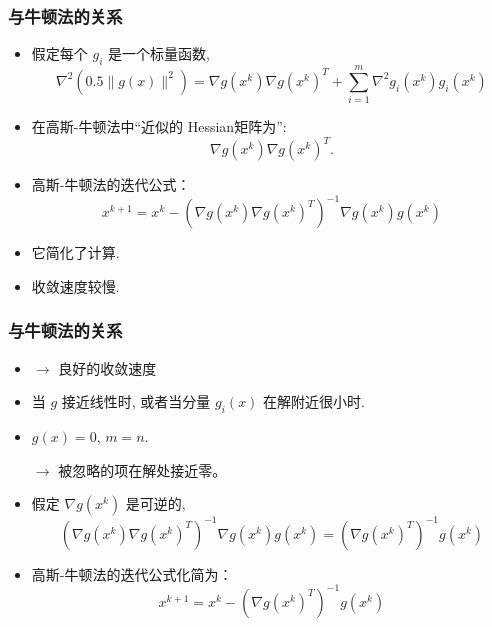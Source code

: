 \documentclass[11pt]{beamer}
\begin{document}
\begin{frame}
\frametitle{与牛顿法的关系}

\begin{itemize}
  \item
假定每个 $g_{i}$ 是一个标量函数,
$$
\nabla^2 \left( 0.5\|g(x)\|^{2} \right) =
\nabla g\left(x^{k}\right) \nabla g\left(x^{k}\right)^{T}
+\sum_{i=1}^{m} \nabla^{2} g_{i}\left(x^{k}\right) g_{i}\left(x^{k}\right)
$$

\item 在高斯-牛顿法中``近似的 Hessian矩阵为'':
$$
\nabla g\left(x^{k}\right) \nabla g\left(x^{k}\right)^{T}.
$$

\item
\begin{footnotesize}
  高斯-牛顿法的迭代公式：
\begin{equation}	
x^{k+1}=x^{k}-\left(\nabla g\left(x^{k}\right) \nabla g\left(x^{k}\right)^{T}\right)^{-1}
 \nabla g\left(x^{k}\right) g\left(x^{k}\right)
\end{equation}
\end{footnotesize}


\end{itemize}

\begin{itemize}
	\item {}
	它简化了计算.
	\item {}
	收敛速度较慢.
\end{itemize}
\end{frame}


\begin{frame}
\frametitle{与牛顿法的关系}

\begin{itemize}
  \item {} $\rightarrow$ 良好的收敛速度  %




\item {}
当 $g$ 接近线性时, 或者当分量 $g_{i}(x)$ 在解附近很小时.

\item {}  $g(x)=0$,   $m=n$.

  $\rightarrow$  被忽略的项在解处接近零。
\item 假定 $\nabla g\left(x^{k}\right)$ 是可逆的,
$$
\left(\nabla g\left(x^{k}\right) \nabla g\left(x^{k}\right)^{T}\right)^{-1} \nabla g\left(x^{k}\right) g\left(x^{k}\right)=\left(\nabla g\left(x^{k}\right)^{T}\right)^{-1} g\left(x^{k}\right)
$$

\item 高斯-牛顿法的迭代公式化简为：
\begin{equation}
x^{k+1}=x^{k}-\left(\nabla g\left(x^{k}\right)^{T}\right)^{-1} g\left(x^{k}\right)
\end{equation}
\end{itemize}

\end{frame}
\end{document}
